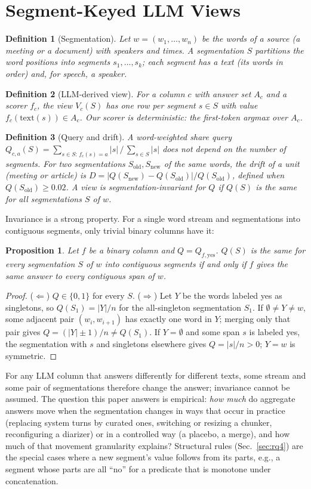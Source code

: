 \documentclass[conference]{IEEEtran}
\newtheorem{definition}{Definition}
\newtheorem{proposition}{Proposition}
\begin{document}
\section{Segment-Keyed LLM Views}\label{sec:model}
\begin{definition}[Segmentation]
Let $w = (w_1,\dots,w_n)$ be the words of a source (a meeting or a document) with speakers and times. A
\emph{segmentation} $S$ partitions the word positions into segments $s_1,\dots,s_k$; each segment has a text (its words
in order) and, for speech, a speaker.
\end{definition}
\begin{definition}[LLM-derived view]
For a column $c$ with answer set $A_c$ and a scorer $f_c$, the view $V_c(S)$ has one row per segment $s\in S$ with value
$f_c(\mathrm{text}(s))\in A_c$. Our scorer is deterministic: the first-token argmax over $A_c$.
\end{definition}
\begin{definition}[Query and drift]
A word-weighted share query $Q_{c,a}(S) = \sum_{s\in S:\,f_c(s)=a}|s| \,/\, \sum_{s\in S}|s|$ does not depend on the
number of segments. For two segmentations $S_{\mathrm{old}},S_{\mathrm{new}}$ of the same words, the drift of a unit
(meeting or article) is $D = |Q(S_{\mathrm{new}}) - Q(S_{\mathrm{old}})| / Q(S_{\mathrm{old}})$, defined when
$Q(S_{\mathrm{old}})\ge 0.02$. A view is \emph{segmentation-invariant} for $Q$ if $Q(S)$ is the same for all segmentations $S$ of $w$.
\end{definition}
Invariance is a strong property. For a single word stream and segmentations into contiguous segments, only trivial
binary columns have it:
\begin{proposition}\label{prop:trivial}
Let $f$ be a binary column and $Q=Q_{f,\mathrm{yes}}$. $Q(S)$ is the same for every segmentation $S$ of $w$ into
contiguous segments if and only if $f$ gives the same answer to every contiguous span of $w$.
\end{proposition}
\begin{proof}
($\Leftarrow$) $Q\in\{0,1\}$ for every $S$. ($\Rightarrow$) Let $Y$ be the words labeled yes as singletons, so
$Q(S_1)=|Y|/n$ for the all-singleton segmentation $S_1$. If $\emptyset\ne Y\ne w$, some adjacent pair $(w_i,w_{i+1})$
has exactly one word in $Y$; merging only that pair gives $Q=(|Y|\pm1)/n\ne Q(S_1)$. If $Y=\emptyset$ and some span $s$
is labeled yes, the segmentation with $s$ and singletons elsewhere gives $Q=|s|/n>0$; $Y=w$ is symmetric.
\end{proof}
For any LLM column that answers differently for different texts, some stream and some pair of segmentations
therefore change the answer; invariance cannot be assumed. The question
this paper answers is empirical: \emph{how much} do aggregate answers move when the segmentation changes in ways
that occur in practice (replacing system turns by curated ones, switching or resizing a chunker, reconfiguring a diarizer) or in
a controlled way (a placebo, a merge), and how much of that movement granularity explains? Structural rules (Sec.~\ref{sec:rq4}) are the
special cases where a new segment's value follows from its parts, e.g., a segment whose parts are all ``no'' for a
predicate that is monotone under concatenation.
\end{document}

